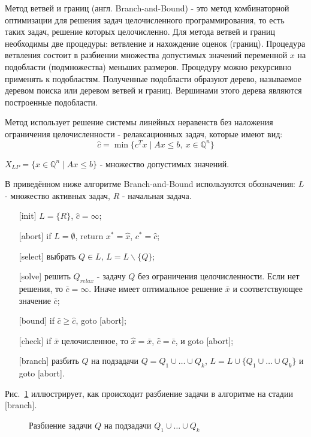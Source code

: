 \documentclass[a4paper,14pt,russian]{extreport}
\begin{document}
Метод ветвей и границ (англ. Branch-and-Bound) - это метод комбинаторной оптимизации для решения задач целочисленного программирования, то есть таких задач, решение которых целочисленно.  Для метода ветвей и границ необходимы две процедуры: ветвление и нахождение оценок (границ). Процедура ветвления состоит в разбиении множества допустимых значений переменной $x$ на подобласти (подмножества) меньших размеров. Процедуру можно рекурсивно применять к подобластям. Полученные подобласти образуют дерево, называемое деревом поиска или деревом ветвей и границ. Вершинами этого дерева являются построенные подобласти.
\par Метод использует решение системы линейных неравенств без наложения ограничения целочисленности - релаксационных задач, которые имеют вид: 
  $$\hat c = \min \{c^Tx \mid Ax\le b,~ x\in\mathbb{Q}^n\}$$
\par $X_{LP} = \{x \in \mathbb{Q}^n \mid Ax \le b\}$ - множество допустимых значений. 
\par В приведённом ниже алгоритме Branch-and-Bound используются обозначения: $L$ - множество активных задач, $R$ - начальная задача. 
  \begin{enumerate}
  \item[{[init]}] $L = \{R\}$, $\hat c = \infty$;
  \item[{[abort]}] if $L = \emptyset$, return $x^*=\hat x$, $c^* = \hat c$;
  \item[[{select]}] выбрать $Q\in L$, $L = L \backslash \{ Q \}$;
  \item[[{solve]}] решить $Q_{relax}$ - задачу $Q$ без ограничения целочисленности. Если нет решения, то $\bar c = \infty$. Иначе имеет оптимальное решение $\bar x$ и соответствующее значение $\bar c$;
  \item[{[bound]}] if $\bar c \ge \hat c$, goto [abort];
  \item[{[check]}] if $\bar x$ целочисленное, то $\hat x = \bar x$, $\hat c = \bar c$, и goto [abort];
  \item[{[branch]}] разбить $Q$ на подзадачи $Q = Q_1 \cup \dots \cup Q_k$, $L = L \cup \{Q_1 \cup \dots \cup Q_k \}$ и goto [abort].
  \end{enumerate}
\par Рис.~\ref{ris:branching} иллюстрирует, как происходит разбиение задачи в алгоритме на стадии [branch].
\par
  \begin{figure}[h]
  \caption{Разбиение задачи $Q$ на подзадачи $Q_1 \cup \dots \cup Q_k$}
  \label{ris:branching}
  \end{figure}
\end{document}
